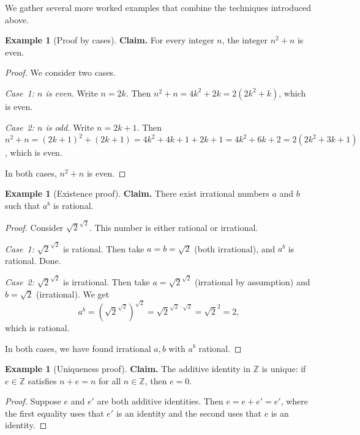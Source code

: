\documentclass[12pt,a4paper,openany]{book}
\theoremstyle{definition}
\newtheorem{example}[definition]{Example}
\theoremstyle{plain}
\theoremstyle{remark}
\newcommand{\Z}{\mathbb{Z}}
\begin{document}
We gather several more worked examples that combine the techniques introduced above.

\begin{example}[Proof by cases]
\label{ex:proof-by-cases}
\textbf{Claim.} For every integer $n$, the integer $n^2 + n$ is even.

\begin{proof}
We consider two cases.

\emph{Case~1: $n$ is even.} Write $n = 2k$. Then $n^2 + n = 4k^2 + 2k = 2(2k^2 + k)$,
which is even.

\emph{Case~2: $n$ is odd.} Write $n = 2k + 1$. Then
$n^2 + n = (2k+1)^2 + (2k+1) = 4k^2 + 4k + 1 + 2k + 1 = 4k^2 + 6k + 2 = 2(2k^2 + 3k + 1)$,
which is even.

In both cases, $n^2 + n$ is even.
\end{proof}
\end{example}

\begin{example}[Existence proof]
\label{ex:existence-proof}
\textbf{Claim.} There exist irrational numbers $a$ and $b$ such that $a^b$ is
rational.

\begin{proof}
Consider $\sqrt{2}^{\sqrt{2}}$. This number is either rational or irrational.

\emph{Case~1:} $\sqrt{2}^{\sqrt{2}}$ is rational. Then take $a = b = \sqrt{2}$
(both irrational), and $a^b$ is rational. Done.

\emph{Case~2:} $\sqrt{2}^{\sqrt{2}}$ is irrational. Then take
$a = \sqrt{2}^{\sqrt{2}}$ (irrational by assumption) and $b = \sqrt{2}$ (irrational).
We get
\[
  a^b = \left(\sqrt{2}^{\sqrt{2}}\right)^{\sqrt{2}}
      = \sqrt{2}^{\sqrt{2} \cdot \sqrt{2}}
      = \sqrt{2}^{2}
      = 2,
\]
which is rational.

In both cases, we have found irrational $a, b$ with $a^b$ rational.
\end{proof}
\end{example}

\begin{example}[Uniqueness proof]
\label{ex:uniqueness-proof}
\textbf{Claim.} The additive identity in $\Z$ is unique: if $e \in \Z$ satisfies
$n + e = n$ for all $n \in \Z$, then $e = 0$.

\begin{proof}
Suppose $e$ and $e'$ are both additive identities. Then $e = e + e' = e'$, where the
first equality uses that $e'$ is an identity and the second uses that $e$ is an identity.
\end{proof}
\end{example}
\end{document}
